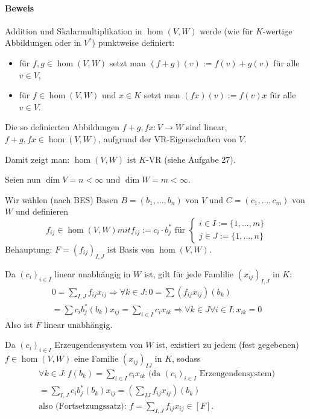 \paragraph{Beweis}
	Addition und Skalarmultiplikation in $\hom (V,W)$ werde (wie für $K$-wertige Abbildungen oder in $V^*$) punktweise definiert:
	\begin{itemize}
		\item für $f,g \in \hom (V,W)$ setzt man $(f+g)(v) := f(v) + g(v)$ für alle $v\in V$,
		\item für $f\in \hom (V,W)$ und $x\in K$ setzt man $(fx)(v) := f(v)x$ für alle $v\in V$.
	\end{itemize}
	Die so definierten Abbildungen $f+g,fx: V\to W$ sind linear, $f+g, fx\in \hom (V,W)$, aufgrund der VR-Eigenschaften von $V$.
	
	Damit zeigt man: $\hom (V,W)$ ist $K$-VR (siehe Aufgabe 27).
	
	Seien nun $\dim V = n < \infty$ und $\dim W = m < \infty$.
	
	Wir wählen (nach BES) Basen $B = (b_1,...,b_n)$ von $V$ und $C=(c_1,...,c_m)$ von $W$ und definieren
		\begin{equation*}
			f_{ij}\in \hom (V,W) mit f_{ij}:= c_i\cdot b_j^* \text{ für } 
				\begin{cases}
					i\in I := \{1,...,m\}\\
					j\in J := \{1,...,n\}
				\end{cases}
		\end{equation*}
	Behauptung: $F=(f_{ij})_{I,J}$ ist Basis von $\hom (V,W)$.
	
	Da $(c_i)_{i\in I}$ linear unabhängig in $W$ ist, gilt für jede Famlilie $(x_{ij})_{I,J}$ in $K$:
		\begin{gather*}
			0 = \sum_{I,J} f_{ij}x_{ij} \Rightarrow \forall k \in J: 0 = \sum (f_{ij}x_{ij})(b_k)\\
			= \sum c_i b_j^* (b_k) x_{ij} = \sum_{i\in I} c_ix_{ik} \Rightarrow \forall k\in J\forall i\in I:x_{ik} = 0
		\end{gather*}
	Also ist $F$ linear unabhängig.
	
	Da $(c_i)_{i\in I}$ Erzeugendensystem von $W$ ist, existiert zu jedem (fest gegebenen) $f\in\hom (V,W)$ eine Familie $(x_{ij})_{IJ}$ in $K$, sodass
		\begin{gather*}
		\forall k\in J: f(b_k) = \sum_{i\in I} c_i x_{ik} \text{ (da $(c_i)_{i\in I}$ Erzeugendensystem)}\\
		= \sum_{I,J}c_ib_j^*(b_k)x_{ij} = \left(\sum_{IJ} f_{ij}x_{ij}\right)(b_k)\\
		\text{also (Fortsetzungssatz): } f=\sum_{I,J}f_{ij}x_{ij} \in [F].
		\end{gather*}
	
